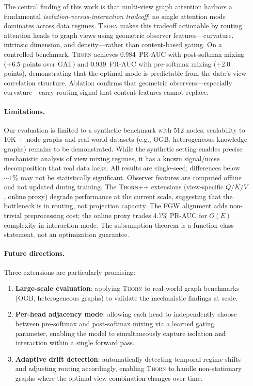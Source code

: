 \documentclass[11pt,a4paper]{article}
\newcommand{\thorn}{\textsc{Thorn}}
\newcommand{\thornpp}{\textsc{Thorn++}}
\begin{document}
The central finding of this work is that multi-view graph attention
harbors a fundamental \emph{isolation-versus-interaction tradeoff}:
no single attention mode dominates across data regimes.
\thorn{} makes this tradeoff actionable by routing attention heads to
graph views using geometric observer features---curvature, intrinsic
dimension, and density---rather than content-based gating.
On a controlled benchmark, \thorn{} achieves 0.984~PR-AUC with
post-softmax mixing ($+6.5$ points over GAT) and 0.939~PR-AUC with
pre-softmax mixing ($+2.0$ points), demonstrating that the optimal
mode is predictable from the data's view correlation structure.
Ablation confirms that geometric observers---especially curvature---carry
routing signal that content features cannot replace.

\paragraph{Limitations.}
Our evaluation is limited to a synthetic benchmark with 512 nodes;
scalability to $10\text{K}+$ node graphs and real-world datasets (e.g.,
OGB, heterogeneous knowledge graphs) remains to be demonstrated.
While the synthetic setting enables precise mechanistic analysis of
view mixing regimes, it has a known signal/noise decomposition that
real data lacks.
All results are single-seed; differences below $\sim\!1\%$ may not be
statistically significant.
Observer features are computed offline and not updated during training.
The \thornpp{} extensions (view-specific $Q/K/V$, online proxy) degrade
performance at the current scale, suggesting that the bottleneck
is in routing, not projection capacity.
The FGW alignment adds non-trivial preprocessing cost; the online
proxy trades 4.7\% PR-AUC for $O(E)$ complexity in interaction mode.
The subsumption theorem is a function-class statement, not an
optimization guarantee.

\paragraph{Future directions.}
Three extensions are particularly promising:
\begin{enumerate}[nosep]
  \item \textbf{Large-scale evaluation}: applying \thorn{} to
    real-world graph benchmarks (OGB, heterogeneous graphs) to validate
    the mechanistic findings at scale.
  \item \textbf{Per-head adjacency mode}: allowing each head to
    independently choose between pre-softmax and post-softmax mixing via
    a learned gating parameter, enabling the model to simultaneously
    capture isolation and interaction within a single forward pass.
  \item \textbf{Adaptive drift detection}: automatically detecting
    temporal regime shifts and adjusting routing accordingly, enabling
    \thorn{} to handle non-stationary graphs where the optimal view
    combination changes over time.
\end{enumerate}



\end{document}
